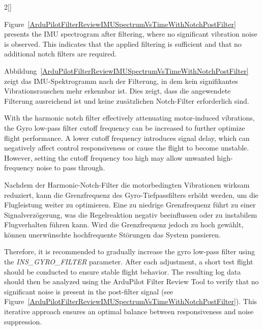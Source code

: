 \begin{paracol}{2}[]
\coleng

Figure~\ref{ArduPilotFilterReviewIMUSpectrumVsTimeWithNotchPostFilter} presents the IMU spectrogram after filtering, where no significant vibration noise is observed. This indicates that the applied filtering is sufficient and that no additional notch filters are required.

\colger

Abbildung~\ref{ArduPilotFilterReviewIMUSpectrumVsTimeWithNotchPostFilter} zeigt das IMU-Spektrogramm nach der Filterung, in dem kein signifikantes Vibrationsrauschen mehr erkennbar ist. Dies zeigt, dass die angewendete Filterung ausreichend ist und keine zusätzlichen Notch-Filter erforderlich sind.

\colende

\renewcommand{\deutschertitel}{Optimierung des Gyro-Filters}
\renewcommand{\englischertitel}{Gyro Filter Optimization}
\makrounterunterabschnitt
\label{ArdupilotGyroLowPassFilter}

With the harmonic notch filter effectively attenuating motor-induced vibrations, the Gyro low-pass filter cutoff frequency can be increased to further optimize flight performance. A lower cutoff frequency introduces signal delay, which can negatively affect control responsiveness or cause the flight to become unstable. However, setting the cutoff frequency too high may allow unwanted high-frequency noise to pass through.

\colger

Nachdem der Harmonic-Notch-Filter die motorbedingten Vibrationen wirksam reduziert, kann die Grenzfrequenz des Gyro-Tiefpassfilters erhöht werden, um die Flugleistung weiter zu optimieren. Eine zu niedrige Grenzfrequenz führt zu einer Signalverzögerung, was die Regelreaktion negativ beeinflussen oder zu instabilem Flugverhalten führen kann. Wird die Grenzfrequenz jedoch zu hoch gewählt, können unerwünschte hochfrequente Störungen das System passieren.

\coleng

Therefore, it is recommended to gradually increase the gyro low-pass filter using the \textsl{INS\_GYRO\_FILTER} parameter. After each adjustment, a short test flight should be conducted to ensure stable flight behavior. The resulting log data should then be analyzed using the ArduPilot Filter Review Tool to verify that no significant noise is present in the post-filter signal (see Figure~\ref{ArduPilotFilterReviewIMUSpectrumVsTimeWithNotchPostFilter}). This iterative approach ensures an optimal balance between responsiveness and noise suppression.


\end{paracol}
